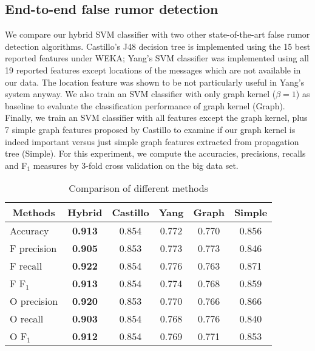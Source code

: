 \subsection{End-to-end false rumor detection}
We compare our hybrid SVM classifier
 with two other state-of-the-art
false rumor detection algorithms\cite{castillo2011information,yang2012automatic}.
Castillo's J48 decision tree is implemented using the 15 best reported
features under WEKA; Yang's SVM classifier was implemented using all 19
reported features except locations of the messages which are not available in
our data. The location feature was shown to be not particularly useful
in Yang's system anyway.
We also train an SVM classifier with only graph kernel
($\beta=1$) as baseline to evaluate the classification performance of
graph kernel (Graph).
Finally, we train an SVM classifier with all features except the graph kernel,
plus 7 simple graph features proposed by Castillo\cite{castillo2011information} 
to examine if our graph kernel is indeed important versus just 
simple graph features extracted from propagation tree (Simple).  
For this experiment, we compute the accuracies,
precisions, recalls and F$_1$ measures by 3-fold cross validation on the
big data set.

\begin{table}[ht]
\centering
\small
\caption{Comparison of different methods}\label{table:result-comparison}
\begin{tabular}{@{}lccccc@{}}
\toprule
\multicolumn{1}{c}{Methods} & Hybrid & Castillo & Yang     & Graph     &Simple \\ \midrule
Accuracy                             & {\bf 0.913} &0.854  & 0.772 & 0.770 &0.856 \\
F precision                          & {\bf 0.905} &0.853  & 0.773 & 0.773 &0.846 \\
F recall                             & {\bf 0.922} &0.854  & 0.776 & 0.763 &0.871 \\
F F$_1$                              & {\bf 0.913} &0.854  & 0.774 & 0.768 &0.859 \\
O precision                          & {\bf 0.920} &0.853  & 0.770 & 0.766 &0.866 \\
O recall                             & {\bf 0.903} &0.854  & 0.768 & 0.776 &0.840 \\
O F$_1$                              & {\bf 0.912} &0.854  & 0.769 & 0.771 &0.853 \\ \bottomrule
\end{tabular}
\end{table}

